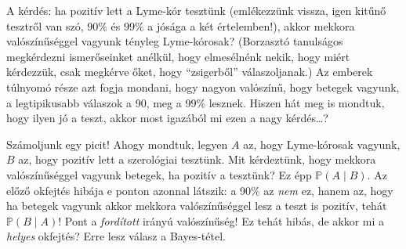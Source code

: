 \documentclass[magyar,]{book}
\begin{document}
A kérdés: ha pozitív lett a Lyme-kór tesztünk (emlékezzünk vissza, igen kitűnő tesztről van szó, 90\% és 99\% a jósága a két értelemben!), akkor mekkora valószínűséggel vagyunk tényleg Lyme-kórosak? (Borzasztó tanulságos megkérdezni ismerőseinket anélkül, hogy elmesélnénk nekik, hogy miért kérdezzük, csak megkérve őket, hogy \enquote{zsigerből} válaszoljanak.) Az emberek túlnyomó része azt fogja mondani, hogy nagyon valószínű, hogy betegek vagyunk, a legtipikusabb válaszok a 90, meg a 99\% lesznek. Hiszen hát meg is mondtuk, hogy ilyen jó a teszt, akkor most igazából mi ezen a nagy kérdés\ldots?

Számoljunk egy picit! Ahogy mondtuk, legyen \(A\) az, hogy Lyme-kórosak vagyunk, \(B\) az, hogy pozitív lett a szerológiai tesztünk. Mit kérdeztünk, hogy mekkora valószínűséggel vagyunk betegek, ha pozitív a tesztünk? Ez épp \(\mathbb{P}\left(A \mid B\right)\). Az előző okfejtés hibája e ponton azonnal látszik: a 90\% az \emph{nem} ez, hanem az, hogy ha betegek vagyunk akkor mekkora valószínűséggel lesz a teszt is pozitív, tehát \(\mathbb{P}\left(B \mid A\right)\)! Pont a \emph{fordított} irányú valószínűség! Ez tehát hibás, de akkor mi a \emph{helyes} okfejtés? Erre lesz válasz a Bayes-tétel.
\end{document}
